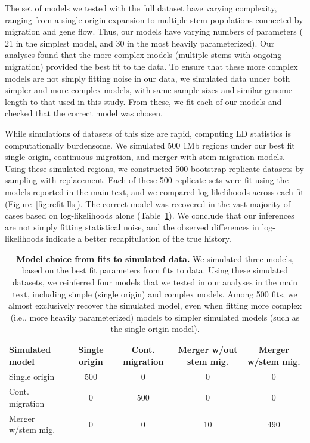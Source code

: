 \documentclass[]{article}
\begin{document}
The set of models we tested with the full dataset have varying complexity,
ranging from a single origin expansion to multiple stem populations connected
by migration and gene flow. Thus, our models have varying numbers of parameters
($21$ in the simplest model, and $30$ in the most heavily parameterized). Our
analyses found that the more complex models (multiple stems with ongoing
migration) provided the best fit to the data. To ensure that these more complex
models are not simply fitting noise in our data, we simulated data under both
simpler and more complex models, with same sample sizes and similar genome
length to that used in this study. From these, we fit each of our models and
checked that the correct model was chosen.

While simulations of datasets of this size are rapid, computing LD statistics
is computationally burdensome. We simulated 500 1Mb regions under our best fit
single origin, continuous migration, and merger with stem migration models.
Using these simulated regions, we constructed 500 bootstrap replicate datasets
by sampling with replacement. Each of these 500 replicate sets were fit using
the models reported in the main text, and we compared log-likelihoods across
each fit (Figure~\ref{fig:refit-lls}). The correct model was recovered in the
vast majority of cases based on log-likelihoods alone
(Table~\ref{tab:confusion-matrix}). We conclude that our inferences are not
simply fitting statistical noise, and the observed differences in
log-likelihoods indicate a better recapitulation of the true history.

\begin{table}[ht]
    \caption{
        \label{tab:confusion-matrix}
        \textbf{Model choice from fits to simulated data.} We simulated three
        models, based on the best fit parameters from fits to data. Using these
        simulated datasets, we reinferred four models that we tested in our
        analyses in the main text, including simple (single origin) and complex
        models. Among 500 fits, we almost exclusively recover the simulated
        model, even when fitting more complex (i.e., more heavily
        parameterized) models to simpler simulated models (such as the single
        origin model).
    }
    \centering
    \begin{tabular}[t]{lcccc}
        \toprule
        Simulated model & Single origin & Cont. migration & Merger w/out stem mig. & Merger w/stem mig. \\
        \midrule
        Single origin & 500 & 0 & 0 & 0 \\
        Cont. migration & 0 & 500 & 0 & 0 \\
        Merger w/stem mig. & 0 & 0 & 10 & 490 \\
        \bottomrule
    \end{tabular}
\end{table}
\end{document}

